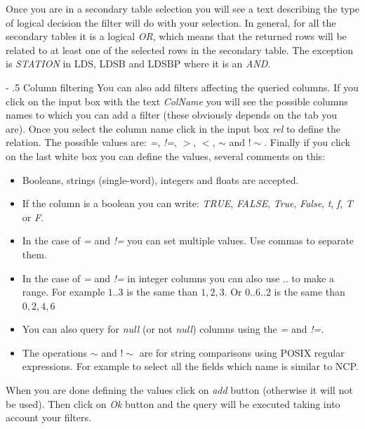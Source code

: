 \documentclass[a4paper,11pt]{article}
\makeatletter
\renewcommand\paragraph{%
   \@startsection{paragraph}{4}{0mm}%
      {-\baselineskip}%
      {.5\baselineskip}%
      {\normalfont\normalsize\bfseries}}
\makeatother
\begin{document}
Once you are in a secondary table selection you will see a text describing the type of logical decision the filter will do with your selection. In general, for all the secondary tables it is a logical \textit{OR}, which means that the returned rows will be related to at least one of the selected rows in the secondary table. The exception is \textit{STATION} in LDS, LDSB and LDSBP where it is an \textit{AND}.

\paragraph{Column filtering}
You can also add filters affecting the queried columns. If you click on the input box with the text \textit{ColName} you will see the possible columns names to which you can add a filter (these obviously depends on the tab you are). Once you select the column name click in the input box \textit{rel} to define the relation. The possible values are: \textit{=}, \textit{!=}, $>$, $<$, $\sim$ and $!\sim$. Finally if you click on the last white box you can define the values, several comments on this:

\begin{itemize}
	\item Booleans, strings (single-word), integers and floats are accepted.

	\item If the column is a boolean you can write: \textit{TRUE}, \textit{FALSE}, \textit{True}, \textit{False}, \textit{t}, \textit{f}, \textit{T} or \textit{F}.

	\item In the case of \textit{=} and \textit{!=} you can set multiple values. Use commas to separate them.

	\item In the case of \textit{=} and \textit{!=} in integer columns you can also use $..$ to make a range. For example $1..3$ is the same than $1,2,3$. Or $0..6..2$ is the same than $0,2,4,6$

	\item You can also query for \textit{null} (or not \textit{null}) columns using the \textit{=} and \textit{!=}.

	\item The operations $\sim$ and $!\sim$ are for string comparisons using POSIX regular expressions. For example to select all the fields which name is similar to NCP.
\end{itemize}
When you are done defining the values click on \textit{add} button (otherwise it will not be used). Then click on \textit{Ok} button and the query will be executed taking into account your filters.
\end{document}
